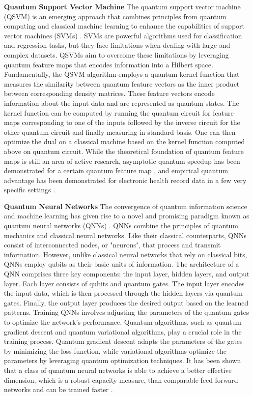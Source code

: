 \documentclass{article}
\begin{document}
\vspace{1cm}
\noindent\textbf{Quantum Support Vector Machine} The quantum support vector machine (QSVM) is an emerging approach that combines principles from quantum computing and classical machine learning to enhance the capabilities of support vector machines (SVMs) \cite{havlivcek2019supervised}. SVMs are powerful algorithms used for classification and regression tasks, but they face limitations when dealing with large and complex datasets. QSVMs aim to overcome these limitations by leveraging quantum feature maps that encodes information into a Hilbert space. Fundamentally, the QSVM algorithm employs a quantum kernel function that measures the similarity between quantum feature vectors as the inner product between corresponding density matrices. These feature vectors encode information about the input data and are represented as quantum states. The kernel function can be computed by running the quantum circuit for feature maps corresponding to one of the inputs followed by the inverse circuit for the other quantum circuit and finally measuring in standard basis. One can then optimize the dual on a classical machine based on the kernel function computed above on quantum circuit. While the theoretical foundation of quantum feature maps is still an area of active research, asymptotic quantum speedup has been demonstrated for a certain quantum feature map \cite{liu2021rigorous}, and empirical quantum advantage has been demonstrated for electronic health record data in a few very specific settings \cite{krunic2022quantum}.  

\vspace{.25cm}
\noindent\textbf{Quantum Neural Networks} The convergence of quantum information science and machine learning has given rise to a novel and promising paradigm known as quantum neural networks (QNNs) \cite{biamonte2017quantum, cerezo2022challenges}. QNNs combine the principles of quantum mechanics and classical neural networks. Like their classical counterparts, QNNs consist of interconnected nodes, or "neurons", that process and transmit information. However, unlike classical neural networks that rely on classical bits, QNNs employ qubits as their basic units of information.  The architecture of a QNN comprises three key components: the input layer, hidden layers, and output layer. Each layer consists of qubits and quantum gates. The input layer encodes the input data, which is then processed through the hidden layers via quantum gates. Finally, the output layer produces the desired output based on the learned patterns. Training QNNs involves adjusting the parameters of the quantum gates to optimize the network's performance. Quantum algorithms, such as quantum gradient descent and quantum variational algorithms, play a crucial role in the training process. Quantum gradient descent adapts the parameters of the gates by minimizing the loss function, while variational algorithms optimize the parameters by leveraging quantum optimization techniques. It has been shown that a class of quantum neural networks is able to achieve a  better effective dimension, which is a robust capacity measure, than comparable feed-forward networks and can be trained faster \cite{abbas2021power}.
\end{document}
